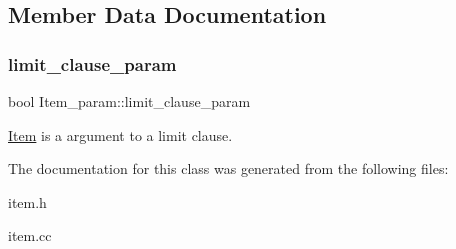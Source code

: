 \subsection{Member Data Documentation}
\mbox{\label{classItem__param_af30c36946ecc0f2d54b89f03bac74cd4}} 
\subsubsection{\texorpdfstring{limit\+\_\+clause\+\_\+param}{limit\_clause\_param}}
{\footnotesize\ttfamily bool Item\+\_\+param\+::limit\+\_\+clause\+\_\+param}

\mbox{\hyperlink{classItem}{Item}} is a argument to a limit clause. 

The documentation for this class was generated from the following files\+:\begin{DoxyCompactItemize}
\item 
item.\+h\item 
item.\+cc\end{DoxyCompactItemize}
